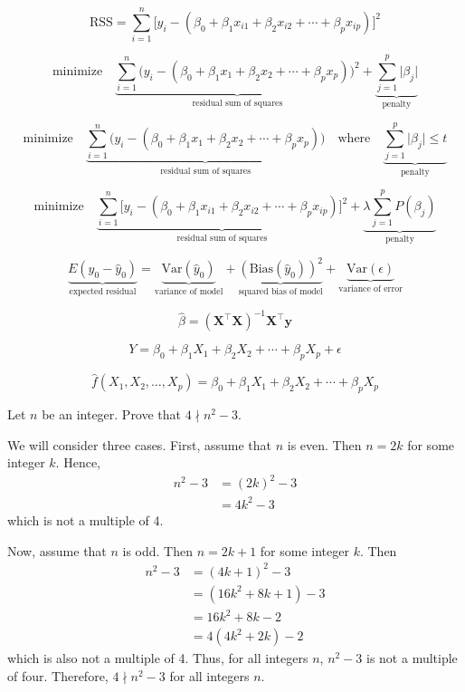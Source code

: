 \documentclass[12pt]{article}
\begin{document}
\[
	\text{RSS} = \sum\limits_{i = 1}^n \Big[ y_i - (\beta_0 + \beta_1 x_{i1} + \beta_2 x_{i2} + \cdots + \beta_p x_{ip})\Big]^2
\]

\[
\text{minimize}\quad \underbrace{\sum\limits_{i = 1}^n \Big( y_i - (\beta_0 + \beta_1 x_1 + \beta_2 x_2 + \cdots + \beta_p x_p)\Big)^2}_{\text{residual sum of squares}} + \underbrace{\sum\limits_{j = 1}^p \vert \beta_j \vert}_{\text{penalty}}
\]

\[
	\text{minimize}\quad \underbrace{\sum\limits_{i = 1}^n \Big( y_i - (\beta_0 + \beta_1 x_1 + \beta_2 x_2 + \cdots + \beta_p x_p)\Big)}_{\text{residual sum of squares}}\quad \text{where}\quad  \underbrace{\sum\limits_{j = 1}^p \vert \beta_j\vert \leq t}_{\text{penalty}}
\]



\[
\text{minimize}\quad \underbrace{\sum\limits_{i = 1}^n \Big[ y_i - (\beta_0 + \beta_1 x_{i1} + \beta_2 x_{i2} + \cdots + \beta_p x_{ip})\Big]^2}_{\text{residual sum of squares}} + \underbrace{\lambda\sum\limits_{j = 1}^p P(\beta_j)}_{\text{penalty}}
\]

\[
	\underbrace{E(y_0 - \hat{y}_0)}_{\text{expected residual}}=\underbrace{\text{Var}(\hat{y}_0)}_{\text{variance of model}} + \underbrace{(\text{Bias}(\hat{y}_0))^2}_{\text{squared bias of model}} + \underbrace{\text{Var}(\epsilon)}_{\text{variance of error}}
\]

\[
	\hat{\beta} = (\mathbf{X}^\top\mathbf{X})^{-1}\mathbf{X}^\top \mathbf{y}
\]

\[
	Y = \beta_0 + \beta_1 X_1 + \beta_2 X_2 + \cdots + \beta_p X_p + \epsilon
\]

\[
	\hat{f}(X_1, X_2, \dotsc, X_p) = \beta_0 + \beta_1 X_1 + \beta_2 X_2 + \cdots + \beta_p X_p
\]

\newpage

Let $n$ be an integer. Prove that $4\nmid n^2 - 3$.

We will consider three cases. First, assume that $n$ is even. Then $n = 2k$ for some integer $k$. Hence,
\begin{align}
	n^2 - 3 &= (2k)^2 - 3 \\
	&= 4k^2 - 3
\end{align}
which is not a multiple of 4.

Now, assume that $n$ is odd. Then $n = 2k + 1$ for some integer $k$. Then
\begin{align}
	n^2 - 3 &= (4k + 1)^2 - 3 \\
	&= (16k^2 + 8k + 1) - 3\\
	&= 16k^2 + 8k - 2\\
	&= 4(4k^2 + 2k) - 2
\end{align}
which is also not a multiple of 4. Thus, for all integers $n$, $n^2 - 3$ is not a multiple of four. Therefore, $4\nmid n^2 - 3$ for all integers $n$.
\end{document}
